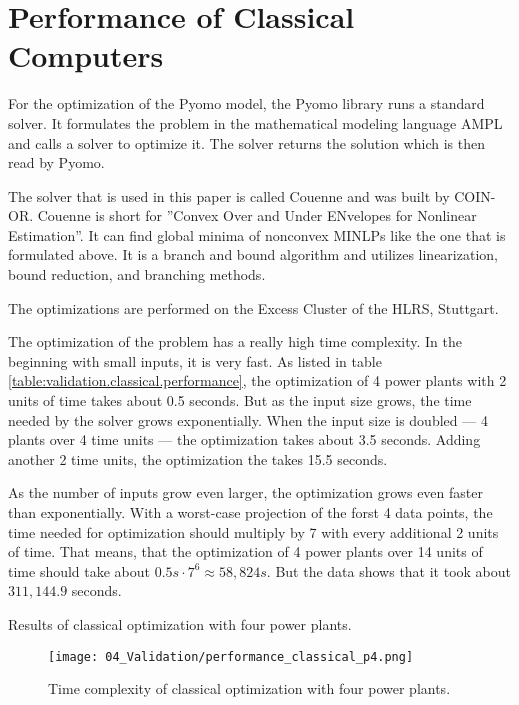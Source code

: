 \section{Performance of Classical Computers}

For the optimization of the Pyomo model, the Pyomo library runs a standard solver.
It formulates the problem in the mathematical modeling language AMPL
and calls a solver to optimize it.
The solver returns the solution which is then read by Pyomo.
\cite{PyomoAMPL}

The solver that is used in this paper is called Couenne and was built by COIN-OR.
Couenne is short for ''Convex Over and Under ENvelopes for Nonlinear Estimation''.
It can find global minima of nonconvex MINLPs like the one that is formulated above.
It is a branch and bound algorithm and utilizes linearization, bound reduction, and branching methods.
\cite{CoinorHome,CouenneRepo}

The optimizations are performed on the Excess Cluster of the HLRS, Stuttgart.
\cite{ExcessHLRS,HLRS}

The optimization of the problem has a really high time complexity.
In the beginning with small inputs, it is very fast.
As listed in table \ref{table:validation.classical.performance}, the optimization of 4 power plants with 2 units of time takes about 0.5 seconds.
But as the input size grows, the time needed by the solver grows exponentially.
When the input size is doubled --- 4 plants over 4 time units --- the optimization takes about 3.5 seconds.
Adding another 2 time units, the optimization the takes 15.5 seconds.

As the number of inputs grow even larger, the optimization grows even faster than exponentially.
With a worst-case projection of the forst 4 data points, the time needed for optimization should multiply by 7 with every additional 2 units of time.
That means, that the optimization of 4 power plants over 14 units of time should take about $0.5s \cdot 7^6 \approx 58,824s$.
But the data shows that it took about $311,144.9$ seconds.

\begin{table}[ht]
  \centering
  
  \caption{Results of classical optimization with four power plants.}
  \label{table:validation.classical.performance}
\end{table}

\begin{figure}[ht]
  \centering
  \texttt{[image: 04\_Validation/performance\_classical\_p4.png]}
  \caption{Time complexity of classical optimization with four power plants.}
  \label{figure:validation.classical.performance}
\end{figure}
